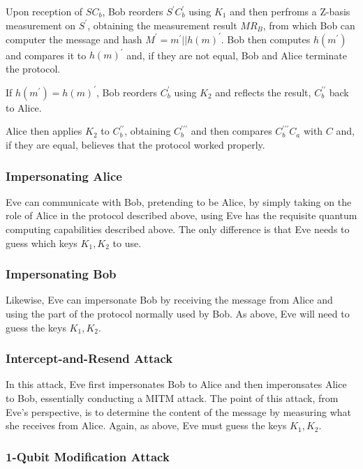 \documentclass[conference]{IEEEtran}
\begin{document}
Upon reception of $SC_{b}$, Bob reorders $S^{\prime}C_{b}^{\prime}$
using $K_{1}$ and then perfroms a Z-basis measurement on $S^{\prime}$,
obtaining the measurement result $MR_{B}$, from which Bob can computer
the message and hash $M^{\prime}=m^{\prime}||h\left(m\right)^{\prime}$.
Bob then computes $h\left(m^{\prime}\right)$ and compares it to $h\left(m\right)^{\prime}$
and, if they are not equal, Bob and Alice terminate the protocol.

If $h\left(m^{\prime}\right)=h\left(m\right)^{\prime}$, Bob reorders
$C_{b}^{\prime}$ using $K_{2}$ and reflects the result, $C_{b}^{\prime\prime}$
back to Alice.

Alice then applies $K_{2}$ to $C_{b}^{\prime\prime}$, obtaining
$C_{b}^{\prime\prime\prime}$ and then compares $C_{b}^{\prime\prime\prime}C_{a}$
with $C$ and, if they are equal, believes that the protocol worked
properly.

\subsubsection{Impersonating Alice}

Eve can communicate with Bob, pretending to be Alice, by simply taking
on the role of Alice in the protocol described above, using Eve has
the requisite quantum computing capabilities described above. The
only difference is that Eve needs to guess which keys $K_{1},K_{2}$
to use.

\subsubsection{Impersonating Bob}

Likewise, Eve can impersonate Bob by receiving the message from Alice
and using the part of the protocol normally used by Bob. As above,
Eve will need to guess the keys $K_{1},K_{2}$.

\subsubsection{Intercept-and-Resend Attack}

In this attack, Eve first impersonates Bob to Alice and then imperonsates
Alice to Bob, essentially conducting a MITM attack. The point of this
attack, from Eve's perspective, is to determine the content of the
message by measuring what she receives from Alice. Again, as above,
Eve must guess the keys $K_{1},K_{2}$.

\subsubsection{1-Qubit Modification Attack}
\end{document}
